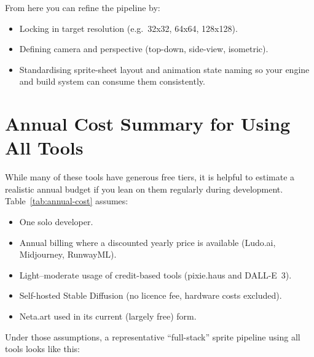 \documentclass[11pt]{article}
\begin{document}
From here you can refine the pipeline by:

\begin{itemize}
    \item Locking in target resolution (e.g.\ 32x32, 64x64, 128x128).
    \item Defining camera and perspective (top-down, side-view, isometric).
    \item Standardising sprite-sheet layout and animation state naming so your engine and build system can consume them consistently.
\end{itemize}

\section{Annual Cost Summary for Using All Tools}

While many of these tools have generous free tiers, it is helpful to estimate a realistic annual budget if you lean on them regularly during development. Table~\ref{tab:annual-cost} assumes:

\begin{itemize}
    \item One solo developer.
    \item Annual billing where a discounted yearly price is available (Ludo.ai, Midjourney, RunwayML).
    \item Light--moderate usage of credit-based tools (pixie.haus and DALL-E~3).
    \item Self-hosted Stable Diffusion (no licence fee, hardware costs excluded).
    \item Neta.art used in its current (largely free) form.
\end{itemize}

Under those assumptions, a representative ``full-stack'' sprite pipeline using all tools looks like this:
\end{document}
